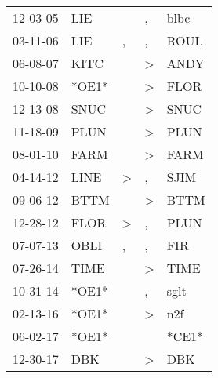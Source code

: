 \begin{supertabular}{p{0.07\textwidth}p{0.06\textwidth}p{0.02\textwidth}p{0.02\textwidth}p{0.06\textwidth}}
 12-03-05\textsuperscript{} &            LIE\textsuperscript{} &               &             , &  blbc\textsuperscript{} \\
 03-11-06\textsuperscript{} &            LIE\textsuperscript{} &             , &             , &  ROUL\textsuperscript{} \\
 06-08-07\textsuperscript{} &           KITC\textsuperscript{} &               &  \textgreater &  ANDY\textsuperscript{} \\
 10-10-08\textsuperscript{} &                            *OE1* &               &  \textgreater &  FLOR\textsuperscript{} \\
 12-13-08\textsuperscript{} &           SNUC\textsuperscript{} &               &  \textgreater &  SNUC\textsuperscript{} \\
 11-18-09\textsuperscript{} &           PLUN\textsuperscript{} &               &  \textgreater &  PLUN\textsuperscript{} \\
 08-01-10\textsuperscript{} &           FARM\textsuperscript{} &               &  \textgreater &  FARM\textsuperscript{} \\
 04-14-12\textsuperscript{} &           LINE\textsuperscript{} &  \textgreater &             , &  SJIM\textsuperscript{} \\
 09-06-12\textsuperscript{} &           BTTM\textsuperscript{} &               &  \textgreater &  BTTM\textsuperscript{} \\
 12-28-12\textsuperscript{} &           FLOR\textsuperscript{} &  \textgreater &             , &  PLUN\textsuperscript{} \\
 07-07-13\textsuperscript{} &           OBLI\textsuperscript{} &             , &             , &   FIR\textsuperscript{} \\
 07-26-14\textsuperscript{} &           TIME\textsuperscript{} &               &  \textgreater &  TIME\textsuperscript{} \\
 10-31-14\textsuperscript{} &                            *OE1* &               &             , &  sglt\textsuperscript{} \\
 02-13-16\textsuperscript{} &                            *OE1* &               &  \textgreater &   n2f\textsuperscript{} \\
 06-02-17\textsuperscript{} &                            *OE1* &               &               &                   *CE1* \\
 12-30-17\textsuperscript{} &            DBK\textsuperscript{} &               &  \textgreater &   DBK\textsuperscript{} \\

\end{supertabular}
